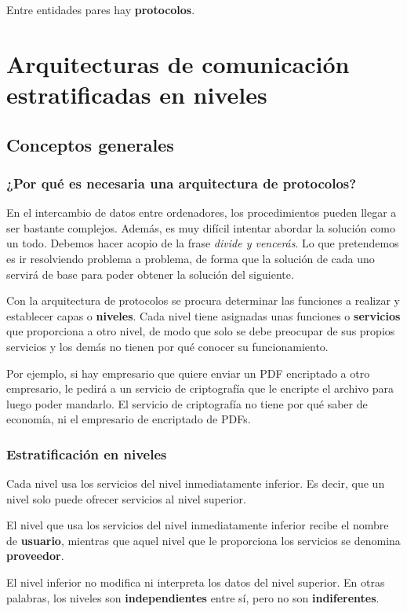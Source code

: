 \documentclass[a4paper]{book}
\begin{document}
Entre entidades pares hay \textbf{protocolos}.




\section{Arquitecturas de comunicación estratificadas en niveles}
\subsection{Conceptos generales}
\subsubsection{¿Por qué es necesaria una arquitectura de protocolos?}
En el intercambio de datos entre ordenadores, los procedimientos pueden llegar a ser bastante complejos. Además, es muy difícil intentar abordar la solución como un todo. Debemos hacer acopio de la frase \textsl{divide y vencerás}.
Lo que pretendemos es ir resolviendo problema a problema, de forma que la solución de cada uno servirá de base para poder obtener la solución del siguiente.

Con la arquitectura de protocolos se procura determinar las funciones a realizar y establecer capas o \textbf{niveles}. Cada nivel tiene asignadas unas funciones o \textbf{servicios} que proporciona a otro nivel, de modo que solo se debe preocupar de sus propios servicios y los demás no tienen por qué conocer su funcionamiento.

Por ejemplo, si hay empresario que quiere enviar un PDF encriptado a otro empresario, le pedirá a un servicio de criptografía que le encripte el archivo para luego poder mandarlo. El servicio de criptografía no tiene por qué saber de economía, ni el empresario de encriptado de PDFs.

\subsubsection{Estratificación en niveles}
Cada nivel usa los servicios del nivel inmediatamente inferior. Es decir, que un nivel solo puede ofrecer servicios al nivel superior.

El nivel que usa los servicios del nivel inmediatamente inferior recibe el nombre de \textbf{usuario}, mientras que aquel nivel que le proporciona los servicios se denomina \textbf{proveedor}.

El nivel inferior no modifica ni interpreta los datos del nivel superior. En otras palabras, los niveles son \textbf{independientes} entre sí, pero no son \textbf{indiferentes}.
\end{document}
